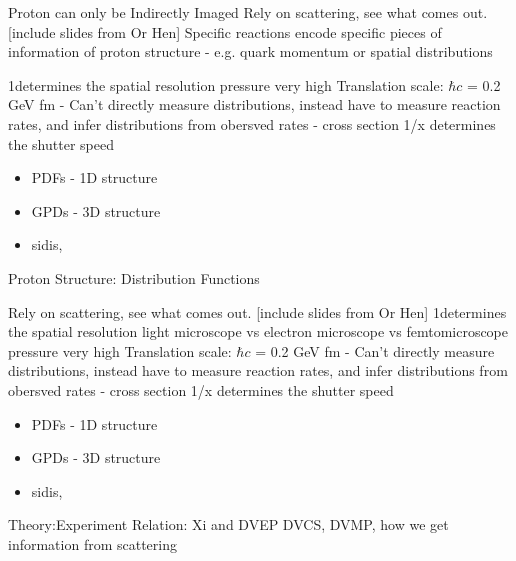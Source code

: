\documentclass[aspectratio=169]{beamer}
\begin{document}
\begin{frame}{Proton can only be Indirectly Imaged}
 Rely on scattering, see what comes out.  [include slides from Or Hen]
 Specific reactions encode specific pieces of information of proton structure - e.g. quark momentum or spatial distributions
 
  1\q determines the spatial resolution
                     pressure very high
                    Translation scale: $\hbar c$ = 0.2 GeV fm - 
                    Can't directly measure distributions, instead have to measure reaction rates, and infer distributions from obersved rates - cross section
                    1/x determines the shutter speed
  \begin{itemize}
                    \item PDFs - 1D structure
                    \item GPDs - 3D structure 
                    \item sidis, 
    \end{itemize}
    
\end{frame}



\begin{frame}{Proton Structure: Distribution Functions}

 Rely on scattering, see what comes out.  [include slides from Or Hen]
  1\q determines the spatial resolution
  light microscope vs electron microscope vs femtomicroscope
                     pressure very high
                    Translation scale: $\hbar c$ = 0.2 GeV fm - 
                    Can't directly measure distributions, instead have to measure reaction rates, and infer distributions from obersved rates - cross section
                    1/x determines the shutter speed
  \begin{itemize}
                    \item PDFs - 1D structure
                    \item GPDs - 3D structure 
                    \item sidis, 
    \end{itemize}
    
\end{frame}



\begin{frame}{Theory:Experiment Relation: Xi and DVEP}
DVCS, DVMP, how we get information from scattering
\end{frame}
\end{document}
